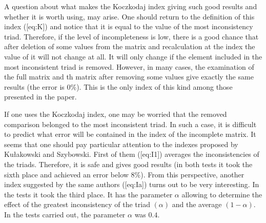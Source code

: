 A question about what makes the Koczkodaj index giving such good results and whether it is worth using, may arise. One should return to the definition of this index ([eq:K]) and notice that it is equal to the value of the most inconsistency triad. Therefore, if the level of incompleteness is low, there is a good chance that after deletion of some values from the matrix and recalculation at the index the value of it will not change at all. It will only change if the element included in the most inconsistent triad is removed. However, in many cases, the examination of the full matrix and th matrix after removing some values give exactly the same results (the error is $0\%$). This is the only index of this kind among those presented in the paper.

If one uses the Koczkodaj index, one may be worried that the removed comparison belonged to the most inconsistent triad. In such a case, it is difficult to predict what error will be contained in the index of the incomplete matrix. It seems that one should pay particular attention to the indexes proposed by Kułakowski and Szybowski. First of them ([eq:I1]) averages the inconsistencies of the triads. Therefore, it is safe and gives good results (in both tests it took the sixth place and achieved an error below $8\%$). From this perspective, another index suggested by the same authors ([eq:Ia]) turns out to be very interesting. In the tests it took the third place. It has the parameter $\alpha$ allowing to determine the effect of the greatest inconsistency of the triad $\left(\alpha\right)$ and the average $\left(1-\alpha\right)$. In the tests carried out, the parameter $\alpha$ was $0.4$.